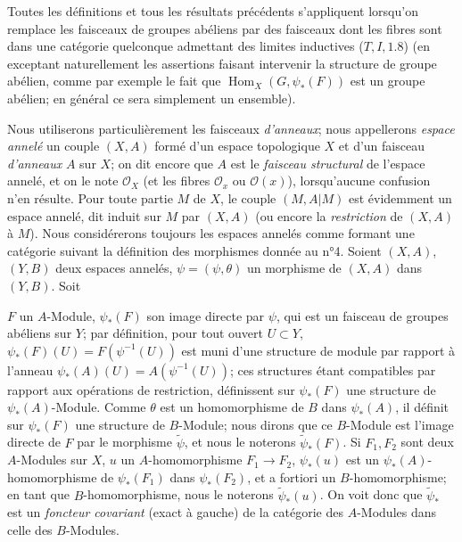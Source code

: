 Toutes les définitions et tous les résultats précédents s'appliquent lorsqu'on remplace les faisceaux de groupes abéliens par des faisceaux dont les fibres sont dans une catégorie quelconque admettant des limites inductives ($T, I, 1.8$) (en exceptant naturellement les assertions faisant intervenir la structure de groupe abélien, comme par exemple le fait que $\operatorname{Hom}_X(G, \psi_*(F))$ est un groupe abélien; en général ce sera simplement un ensemble).

Nous utiliserons particulièrement les faisceaux \emph{d'anneaux}; nous appellerons \emph{espace annelé} un couple $(X,A)$ formé d'un espace topologique $X$ et d'un faisceau \emph{d'anneaux} $A$ sur $X$; on dit encore que $A$ est le \emph{faisceau structural} de l'espace annelé, et on le note $\mathcal{O}_X$ (et les fibres $\mathcal{O}_x$ ou $\mathcal{O}(x)$), lorsqu'aucune confusion n'en résulte. Pour toute partie $M$ de $X$, le couple $(M, A|M)$ est évidemment un espace annelé, dit induit sur $M$ par $(X,A)$ (ou encore la \emph{restriction} de $(X,A)$ à $M$). Nous considérerons toujours les espaces annelés comme formant une catégorie suivant la définition des morphismes donnée au n°4. Soient $(X,A)$, $(Y,B)$ deux espaces annelés, $\psi = (\psi,\theta)$ un morphisme de $(X,A)$ dans $(Y,B)$. Soit

\newpage


$F$ un $A$-Module, $\psi_*(F)$ son image directe par $\psi$, qui est un faisceau de groupes abéliens sur $Y$; par définition, pour tout ouvert $U \subset Y$, $\psi_*(F)(U) = F(\psi^{-1}(U))$ est muni d'une structure de module par rapport à l'anneau $\psi_*(A)(U) = A(\psi^{-1}(U))$; ces structures étant compatibles par rapport aux opérations de restriction, définissent sur $\psi_*(F)$ une structure de $\psi_*(A)$-Module. Comme $\theta$ est un homomorphisme de $B$ dans $\psi_*(A)$, il définit sur $\psi_*(F)$ une structure de $B$-Module; nous dirons que ce $B$-Module est l'image directe de $F$ par le morphisme $\tilde{\psi}$, et nous le noterons $\tilde{\psi}_*(F)$. Si $F_1, F_2$ sont deux $A$-Modules sur $X$, $u$ un $A$-homomorphisme $F_1 \to F_2$, $\psi_*(u)$ est un $\psi_*(A)$-homomorphisme de $\psi_*(F_1)$ dans $\psi_*(F_2)$, et a fortiori un $B$-homomorphisme; en tant que $B$-homomorphisme, nous le noterons $\tilde{\psi}_*(u)$. On voit donc que $\tilde{\psi}_*$ est un \emph{foncteur covariant} (exact à gauche) de la catégorie des $A$-Modules dans celle des $B$-Modules.

